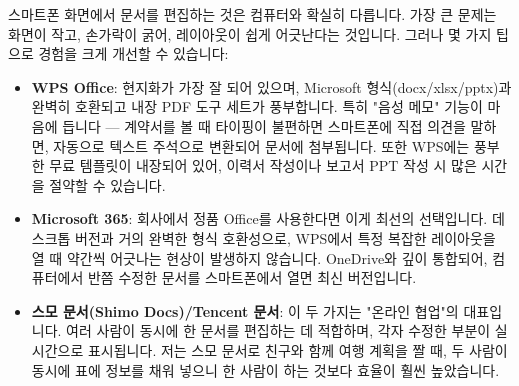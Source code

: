 


스마트폰 화면에서 문서를 편집하는 것은 컴퓨터와 확실히 다릅니다. 가장 큰 문제는 화면이 작고, 손가락이 굵어, 레이아웃이 쉽게 어긋난다는 것입니다. 그러나 몇 가지 팁으로 경험을 크게 개선할 수 있습니다:

\begin{itemize}
  \item \textbf{WPS Office}: 현지화가 가장 잘 되어 있으며, Microsoft 형식(docx/xlsx/pptx)과 완벽히 호환되고 내장 PDF 도구 세트가 풍부합니다. 특히 "음성 메모" 기능이 마음에 듭니다 — 계약서를 볼 때 타이핑이 불편하면 스마트폰에 직접 의견을 말하면, 자동으로 텍스트 주석으로 변환되어 문서에 첨부됩니다. 또한 WPS에는 풍부한 무료 템플릿이 내장되어 있어, 이력서 작성이나 보고서 PPT 작성 시 많은 시간을 절약할 수 있습니다.
  \item \textbf{Microsoft 365}: 회사에서 정품 Office를 사용한다면 이게 최선의 선택입니다. 데스크톱 버전과 거의 완벽한 형식 호환성으로, WPS에서 특정 복잡한 레이아웃을 열 때 약간씩 어긋나는 현상이 발생하지 않습니다. OneDrive와 깊이 통합되어, 컴퓨터에서 반쯤 수정한 문서를 스마트폰에서 열면 최신 버전입니다.
  \item \textbf{스모 문서(Shimo Docs)/Tencent 문서}: 이 두 가지는 "온라인 협업"의 대표입니다. 여러 사람이 동시에 한 문서를 편집하는 데 적합하며, 각자 수정한 부분이 실시간으로 표시됩니다. 저는 스모 문서로 친구와 함께 여행 계획을 짤 때, 두 사람이 동시에 표에 정보를 채워 넣으니 한 사람이 하는 것보다 효율이 훨씬 높았습니다.
\end{itemize}

